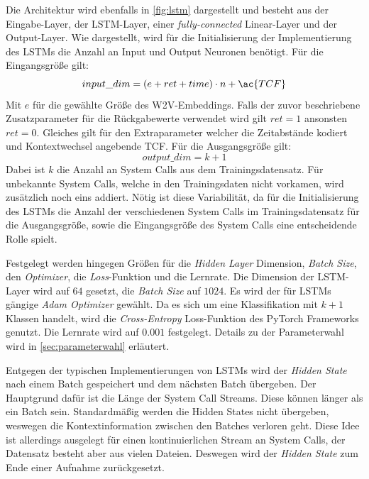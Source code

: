         Die Architektur wird ebenfalls in \autoref{fig:lstm} dargestellt und besteht aus der Eingabe-Layer, der \ac{LSTM}-Layer, einer \textit{fully-connected} Linear-Layer und der Output-Layer.
        Wie dargestellt, wird für die Initialisierung der Implementierung des \acp{LSTM} die Anzahl an Input und Output Neuronen benötigt.
        Für die Eingangsgröße gilt:
        \begin{equation}
            input\_dim = (e + ret + time) \cdot n + \ac{TCF}
        \end{equation}
        Mit $e$ für die gewählte Größe des \ac{W2V}-Embeddings.
        Falls der zuvor beschriebene Zusatzparameter für die Rückgabewerte verwendet wird gilt $ret=1$ ansonsten $ret=0$.
        Gleiches gilt für den Extraparameter welcher die Zeitabstände kodiert und Kontextwechsel angebende \ac{TCF}.
        Für die Ausgangsgröße gilt:
        \begin{equation}
            output\_dim = k + 1
        \end{equation}
        Dabei ist $k$ die Anzahl an System Calls aus dem Trainingsdatensatz.
        Für unbekannte System Calls, welche in den Trainingsdaten nicht vorkamen, wird zusätzlich noch eins addiert.
        Nötig ist diese Variabilität, da für die Initialisierung des \acp{LSTM} die Anzahl der verschiedenen System Calls im Trainingsdatensatz für die Ausgangsgröße, sowie die Eingangsgröße des System Calls eine entscheidende Rolle spielt.

        Festgelegt werden hingegen Größen für die \textit{Hidden Layer} Dimension, \textit{Batch Size}, den \textit{Optimizer}, die \textit{Loss}-Funktion und die Lernrate.
        Die Dimension der \ac{LSTM}-Layer wird auf $64$ gesetzt, die \textit{Batch Size} auf $1024$.
        Es wird der für \acp{LSTM} gängige \textit{Adam Optimizer} gewählt.
        Da es sich um eine Klassifikation mit $k+1$ Klassen handelt, wird die \textit{Cross-Entropy} Loss-Funktion des PyTorch Frameworks genutzt.
        Die Lernrate wird auf $0.001$ festgelegt.
        Details zu der Parameterwahl wird in \autoref{sec:parameterwahl} erläutert.

        Entgegen der typischen Implementierungen von \acp{LSTM} wird der \textit{Hidden State} nach einem Batch gespeichert und dem nächsten Batch  übergeben. 
        Der Hauptgrund dafür ist die Länge der System Call Streams.
        Diese können länger als ein Batch sein.
        Standardmäßig werden die Hidden States nicht übergeben, weswegen die Kontextinformation zwischen den Batches verloren geht.
        Diese Idee ist allerdings ausgelegt für einen kontinuierlichen Stream an System Calls, der Datensatz besteht aber aus vielen Dateien.
        Deswegen wird der \textit{Hidden State} zum Ende einer Aufnahme zurückgesetzt.

